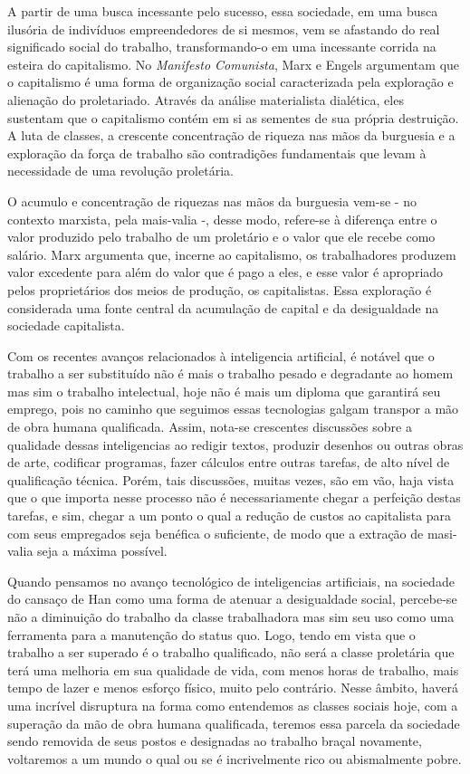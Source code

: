 \par
A partir de uma busca incessante pelo sucesso, essa sociedade, em uma busca ilusória de indivíduos empreendedores de si mesmos, vem se afastando do real significado social do trabalho, transformando-o em uma incessante corrida na esteira do capitalismo. No \textit{Manifesto Comunista}, Marx e Engels \cite{ManifestoComunista} argumentam que o capitalismo é uma forma de organização social caracterizada pela exploração e alienação do proletariado. Através da análise materialista dialética, eles sustentam que o capitalismo contém em si as sementes de sua própria destruição. A luta de classes, a crescente concentração de riqueza nas mãos da burguesia e a exploração da força de trabalho são contradições fundamentais que levam à necessidade de uma revolução proletária.
\par
O acumulo e concentração de riquezas nas mãos da burguesia vem-se - no contexto marxista, pela mais-valia -, desse modo, refere-se à diferença entre o valor produzido pelo trabalho de um proletário e o valor que ele recebe como salário. Marx argumenta que, incerne ao capitalismo, os trabalhadores produzem valor excedente para além do valor que é pago a eles, e esse valor é apropriado pelos proprietários dos meios de produção, os capitalistas. Essa exploração é considerada uma fonte central da acumulação de capital e da desigualdade na sociedade capitalista.
\par
Com os recentes avanços relacionados à inteligencia artificial, é notável que o trabalho a ser substituído não é mais o trabalho pesado e degradante ao homem mas sim o trabalho intelectual, hoje não é mais um diploma que garantirá seu emprego, pois no caminho que seguimos essas tecnologias galgam transpor a mão de obra humana qualificada. Assim, nota-se crescentes discussões sobre a qualidade dessas inteligencias ao redigir textos, produzir desenhos ou outras obras de arte, codificar programas, fazer cálculos entre outras tarefas, de alto nível de qualificação técnica. Porém, tais discussões, muitas vezes, são em vão, haja vista que o que importa nesse processo não é necessariamente chegar a perfeição destas tarefas, e sim, chegar a um ponto o qual a redução de custos ao capitalista para com seus empregados seja benéfica o suficiente, de modo que a extração de masi-valia seja a máxima possível.
\par
Quando pensamos no avanço tecnológico de inteligencias artificiais, na sociedade do cansaço de Han como uma forma de atenuar a desigualdade social, percebe-se não a diminuição do trabalho da classe trabalhadora mas sim seu uso como uma ferramenta para a manutenção do status quo. Logo, tendo em vista que o trabalho a ser superado é o trabalho qualificado, não será a classe proletária que terá uma melhoria em sua qualidade de vida, com menos horas de trabalho, mais tempo de lazer e menos esforço físico, muito pelo contrário. Nesse âmbito, haverá uma incrível disruptura na forma como entendemos as classes sociais hoje, com a superação da mão de obra humana qualificada, teremos essa parcela da sociedade sendo removida de seus postos e designadas ao trabalho braçal novamente, voltaremos a um mundo o qual ou se é incrivelmente rico ou abismalmente pobre.
